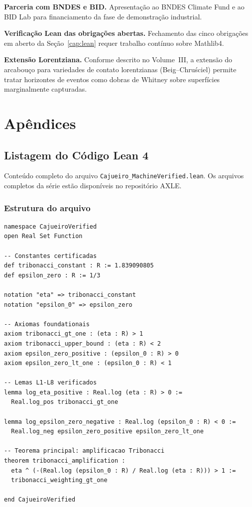 \documentclass[12pt,a4paper,twoside]{book}
\theoremstyle{plain}
\theoremstyle{definition}
\theoremstyle{definition}
\begin{document}
\textbf{Parceria com BNDES e BID.} Apresentação ao BNDES Climate Fund
e ao BID Lab para financiamento da fase de demonstração industrial.

\textbf{Verificação Lean das obrigações abertas.} Fechamento das cinco
obrigações em aberto da Seção~\ref{cap:lean} requer trabalho contínuo
sobre Mathlib4.

\textbf{Extensão Lorentziana.} Conforme descrito no Volume~III, a extensão
do arcabouço para variedades de contato lorentzianas (Beig--Chruściel)
permite tratar horizontes de eventos como dobras de Whitney sobre
superfícies marginalmente capturadas.

\appendix
\part{Apêndices}

\chapter{Listagem do Código Lean 4}
\label{ap:lean-codigo}

Conteúdo completo do arquivo \texttt{Cajueiro\_MachineVerified.lean}.
Os arquivos completos da série estão disponíveis no repositório AXLE.

\section*{Estrutura do arquivo}

\begin{lstlisting}[language=lean]
namespace CajueiroVerified
open Real Set Function

-- Constantes certificadas
def tribonacci_constant : R := 1.839090805
def epsilon_zero : R := 1/3

notation "eta" => tribonacci_constant
notation "epsilon_0" => epsilon_zero

-- Axiomas foundationais
axiom tribonacci_gt_one : (eta : R) > 1
axiom tribonacci_upper_bound : (eta : R) < 2
axiom epsilon_zero_positive : (epsilon_0 : R) > 0
axiom epsilon_zero_lt_one : (epsilon_0 : R) < 1

-- Lemas L1-L8 verificados
lemma log_eta_positive : Real.log (eta : R) > 0 :=
  Real.log_pos tribonacci_gt_one

lemma log_epsilon_zero_negative : Real.log (epsilon_0 : R) < 0 :=
  Real.log_neg epsilon_zero_positive epsilon_zero_lt_one

-- Teorema principal: amplificacao Tribonacci
theorem tribonacci_amplification :
  eta ^ (-(Real.log (epsilon_0 : R) / Real.log (eta : R))) > 1 :=
  tribonacci_weighting_gt_one

end CajueiroVerified
\end{lstlisting}
\end{document}

